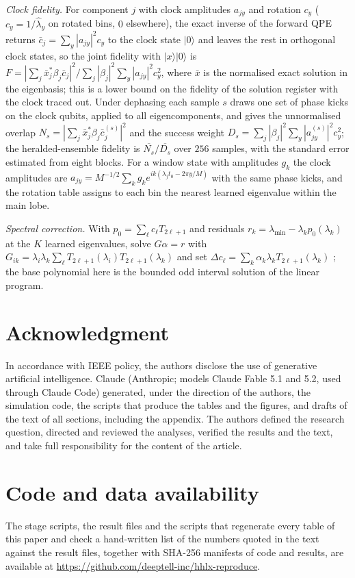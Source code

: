 \documentclass[journal]{IEEEtran}
\newcommand{\lmin}{\lambda_{\min}}
\begin{document}
\emph{Clock fidelity.} For component $j$ with clock amplitudes $a_{jy}$ and rotation $c_y$ ($c_y=1/\hat\lambda_y$ on rotated bins, $0$ elsewhere), the exact inverse of the forward QPE returns $\bar c_j=\sum_y|a_{jy}|^2c_y$ to the clock state $|0\rangle$ and leaves the rest in orthogonal clock states, so the joint fidelity with $|x\rangle|0\rangle$ is $F=|\sum_j\bar x_j^*\beta_j\bar c_j|^2/\sum_j|\beta_j|^2\sum_y|a_{jy}|^2c_y^2$, where $\bar x$ is the normalised exact solution in the eigenbasis; this is a lower bound on the fidelity of the solution register with the clock traced out. Under dephasing each sample $s$ draws one set of phase kicks on the clock qubits, applied to all eigencomponents, and gives the unnormalised overlap $N_s=|\sum_j\bar x_j^*\beta_j\bar c_j^{(s)}|^2$ and the success weight $D_s=\sum_j|\beta_j|^2\sum_y|a_{jy}^{(s)}|^2c_y^2$; the heralded-ensemble fidelity is $\overline{N_s}/\overline{D_s}$ over $256$ samples, with the standard error estimated from eight blocks. For a window state with amplitudes $g_k$ the clock amplitudes are $a_{jy}=M^{-1/2}\sum_kg_ke^{ik(\lambda_jt_0-2\pi y/M)}$ with the same phase kicks, and the rotation table assigns to each bin the nearest learned eigenvalue within the main lobe.

\emph{Spectral correction.} With $p_0=\sum_\ell c_\ell T_{2\ell+1}$ and residuals $r_k=\lmin-\lambda_kp_0(\lambda_k)$ at the $K$ learned eigenvalues, solve $G\alpha=r$ with $G_{ik}=\lambda_i\lambda_k\sum_\ell T_{2\ell+1}(\lambda_i)T_{2\ell+1}(\lambda_k)$ and set $\Delta c_\ell=\sum_k\alpha_k\lambda_kT_{2\ell+1}(\lambda_k)$ \cite{Suresh2026}; the base polynomial here is the bounded odd interval solution of the linear program.

\section*{Acknowledgment}
In accordance with IEEE policy, the authors disclose the use of generative artificial intelligence. Claude (Anthropic; models Claude Fable 5.1 and 5.2, used through Claude Code) generated, under the direction of the authors, the simulation code, the scripts that produce the tables and the figures, and drafts of the text of all sections, including the appendix. The authors defined the research question, directed and reviewed the analyses, verified the results and the text, and take full responsibility for the content of the article.

\section*{Code and data availability}
The stage scripts, the result files and the scripts that regenerate every table of this paper and check a hand-written list of the numbers quoted in the text against the result files, together with SHA-256 manifests of code and results, are available at \url{https://github.com/deeptell-inc/hhlx-reproduce}.



\end{document}
